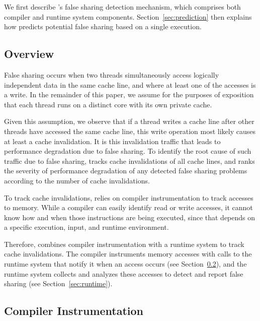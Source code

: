 \label{sec:detection}

We first describe \Predator{}'s false sharing detection mechanism, which comprises both compiler and runtime system
components. Section~\ref{sec:prediction} then explains how \Predator{} predicts potential false sharing based on a single execution.

\subsection{Overview}
\label{sec:overview}

False sharing occurs when two threads
simultaneously access logically independent data in the same cache line, and where at least one of the accesses is a write.
In the remainder of this paper, we assume for the purposes of exposition that each thread runs on a 
distinct core with its own private cache.

Given this assumption, we observe that 
if a thread writes a cache line after other threads have 
accessed the same cache line, this write operation most likely causes at least a cache invalidation. It is this invalidation traffic that leads to performance degradation due to false sharing. To identify the root cause of such traffic due to false sharing, \Predator{} tracks cache invalidations of all cache lines, and ranks the severity of performance degradation of any detected false sharing problems according to the number of cache invalidations. 
 


To track cache invalidations, \Predator{} relies on compiler instrumentation to track accesses to memory. While a compiler can easily identify read or write accesses, it cannot know how and when those instructions are being executed, since that depends on a specific execution, input, and runtime environment.

Therefore, \Predator{} combines compiler instrumentation with a runtime system to track cache invalidations. The compiler
instruments memory accesses with calls to the runtime system that notify it when an access occurs (see Section~\ref{sec:compiler}), and the runtime system collects and analyzes these accesses to detect and report false sharing (see Section~\ref{sec:runtime}).

\subsection{Compiler Instrumentation}
\label{sec:compiler}

